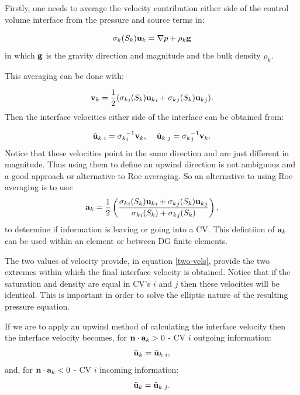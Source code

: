 Firstly, one needs to average the velocity contribution either side of the control volume 
interface 
from the pressure and source terms in:


\begin{equation}
\sigma_k(S_k){\bf u}_k =  \nabla p + \rho_k {\bf g}
\label{force-o}  
\end{equation} 
in which $\bf g$ is the gravity direction and magnitude and the bulk 
density $\rho_k$. 

This averaging  can be done with: 


\begin{equation}
{{\bf v}}_k = \frac{1}{2} ( {\sigma_k}_i(S_k){{\bf u}_k}_i + {\sigma_k}_j(S_k){{\bf u}_k}_j ) . 
\end{equation} 
Then the interface velocities either side of the interface can be obtained from: 

\begin{equation}
{\tilde{\bf u}_k}\:_i=   {\sigma_k}_i^{-1}  {{\bf v}}_k  , \;\;\;\; 
{\tilde{\bf u}_k}\:_j =  {\sigma_k}_j^{-1}  {{\bf v}}_k    . 
\label{two-vels}
\end{equation} 
Notice that these velocities point in the same direction and are just different in magnitude. 
Thus using them to define an upwind direction is not ambiguous and a good approach or alternative 
to Roe averaging. 
So an alternative to using Roe averaging is to use: 
\begin{equation}
{\bf a}_k= \frac{1}{2} \left( \frac{
 {\sigma_k}_i(S_k){{\bf u}_k}_i + {\sigma_k}_j(S_k){{\bf u}_k}_j 
}
{ {\sigma_k}_i(S_k)+{\sigma_k}_j(S_k)} \right),
\end{equation} 
to determine if information is leaving or going into a CV. This defintiion of ${\bf a}_k$ can be used 
within an element or between DG finite elements. 



The two values of velocity provide, in equation \ref{two-vels}, provide the two extremes within which the final interface 
velocity is obtained. Notice that if the saturation and density are equal in 
CV's $i$ and $j$ then these velocities will be identical. This is important in order to 
solve the elliptic nature of the resulting pressure equation. 

If we are to apply an upwind method of calculating the interface velocity then 
the interface velocity becomes, for ${\bf n}\cdot {\bf a}_k>0$ - CV $i$ outgoing information:
\begin{equation}
{\tilde{\bf u}}_k = {\tilde{\bf u}}_k\:_i ,
\end{equation} 
and, for ${\bf n}\cdot {\bf a}_k<0$ - CV $i$ incoming information:
\begin{equation}
{\tilde{\bf u}}_k = {\tilde{\bf u}}_k\:_j. 
\end{equation} 


